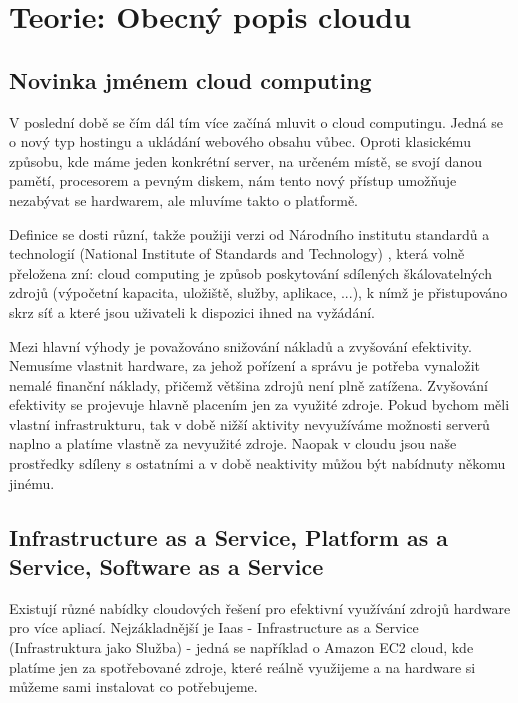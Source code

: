 \chapter{Teorie: Obecný popis cloudu}

\section{Novinka jménem cloud computing}
V poslední době se čím dál tím více začíná mluvit o cloud computingu. Jedná se o nový typ hostingu a ukládání webového obsahu vůbec. Oproti klasickému způsobu, kde máme jeden konkrétní server, na určeném místě, se svojí danou pamětí, procesorem a pevným diskem, nám tento nový přístup umožňuje nezabývat se hardwarem, ale mluvíme takto o platformě. 

Definice se dosti různí, takže použiji verzi od Národního institutu standardů a technologií (National Institute of Standards and Technology) \cite{nist-cloud},
která volně přeložena zní: cloud computing je způsob poskytování sdílených škálovatelných zdrojů (výpočetní kapacita, uložiště, služby, aplikace, ...), k nímž je přistupováno skrz síť a které jsou uživateli k dispozici ihned na vyžádání. 

Mezi hlavní výhody je považováno snižování nákladů a zvyšování efektivity. Nemusíme vlastnit hardware, za jehož pořízení a správu je potřeba vynaložit nemalé finanční náklady, přičemž většina zdrojů není plně zatížena. Zvyšování efektivity se projevuje hlavně placením jen za využité zdroje. Pokud bychom měli vlastní infrastrukturu, tak v době nižší aktivity nevyužíváme možnosti serverů naplno a platíme vlastně za nevyužité zdroje. Naopak v cloudu jsou naše prostředky sdíleny s ostatními a v době neaktivity můžou být nabídnuty někomu jinému.

\section{Infrastructure as a Service, Platform as a Service, Software as a Service}
Existují různé nabídky cloudových řešení pro efektivní využívání zdrojů hardware pro více apliací. Nejzákladnější je Iaas - Infrastructure as a Service (Infrastruktura jako Služba) - jedná se například o Amazon EC2 \cite{amazon-ec2} cloud, kde platíme jen za spotřebované zdroje, které reálně využijeme a na hardware si můžeme sami instalovat co potřebujeme. 

